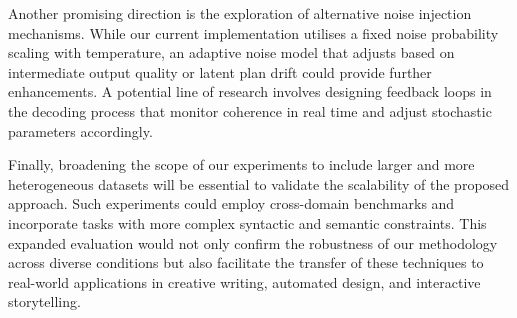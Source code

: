 \documentclass{article} %
\begin{document}
Another promising direction is the exploration of alternative noise injection mechanisms. While our current implementation utilises a fixed noise probability scaling with temperature, an adaptive noise model that adjusts based on intermediate output quality or latent plan drift could provide further enhancements. A potential line of research involves designing feedback loops in the decoding process that monitor coherence in real time and adjust stochastic parameters accordingly.

Finally, broadening the scope of our experiments to include larger and more heterogeneous datasets will be essential to validate the scalability of the proposed approach. Such experiments could employ cross-domain benchmarks and incorporate tasks with more complex syntactic and semantic constraints. This expanded evaluation would not only confirm the robustness of our methodology across diverse conditions but also facilitate the transfer of these techniques to real-world applications in creative writing, automated design, and interactive storytelling.



\end{document}
